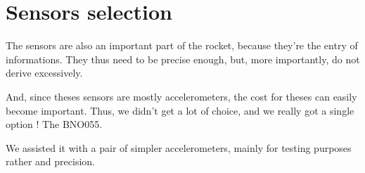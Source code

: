 \section{Sensors selection}
The sensors are also an important part of the rocket, because they're the entry of informations.
They thus need to be precise enough, but, more importantly, do not derive excessively.

And, since theses sensors are mostly accelerometers, the cost for theses can easily become
important. Thus, we didn't get a lot of choice, and we really got a single option ! The BNO055.

We assisted it with a pair of simpler accelerometers, mainly for testing purposes rather and
precision.